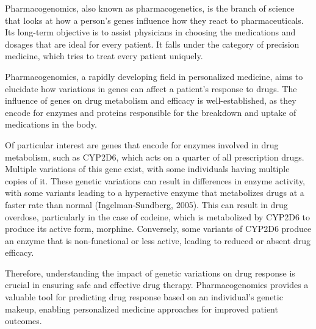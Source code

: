 \documentclass[
]{article}
\begin{document}
Pharmacogenomics, also known as pharmacogenetics, is the branch of
science that looks at how a person's genes influence how they react to
pharmaceuticals. Its long-term objective is to assist physicians in
choosing the medications and dosages that are ideal for every patient.
It falls under the category of precision medicine, which tries to treat
every patient uniquely.

Pharmacogenomics, a rapidly developing field in personalized medicine,
aims to elucidate how variations in genes can affect a patient's
response to drugs. The influence of genes on drug metabolism and
efficacy is well-established, as they encode for enzymes and proteins
responsible for the breakdown and uptake of medications in the body.

Of particular interest are genes that encode for enzymes involved in
drug metabolism, such as CYP2D6, which acts on a quarter of all
prescription drugs. Multiple variations of this gene exist, with some
individuals having multiple copies of it. These genetic variations can
result in differences in enzyme activity, with some variants leading to
a hyperactive enzyme that metabolizes drugs at a faster rate than normal
(Ingelman-Sundberg, 2005). This can result in drug overdose,
particularly in the case of codeine, which is metabolized by CYP2D6 to
produce its active form, morphine. Conversely, some variants of CYP2D6
produce an enzyme that is non-functional or less active, leading to
reduced or absent drug efficacy.

Therefore, understanding the impact of genetic variations on drug
response is crucial in ensuring safe and effective drug therapy.
Pharmacogenomics provides a valuable tool for predicting drug response
based on an individual's genetic makeup, enabling personalized medicine
approaches for improved patient outcomes.
\end{document}
